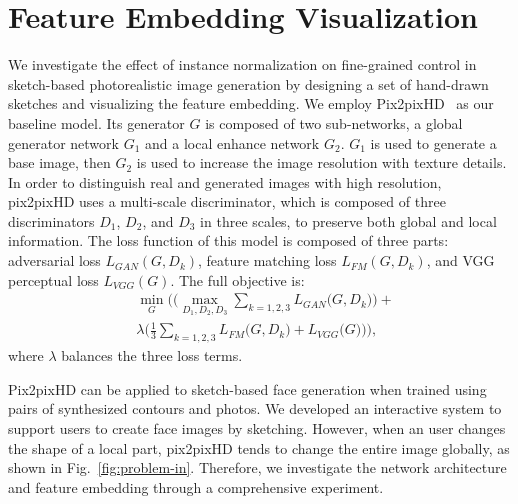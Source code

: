 \section{Feature Embedding Visualization}
\label{sec:visualize}

We investigate the effect of instance normalization on fine-grained control in sketch-based photorealistic image generation by designing a set of hand-drawn sketches and visualizing the feature embedding.
We employ Pix2pixHD~\cite{pix2pixhd} as our baseline model.
Its generator $G$ is composed of two sub-networks, a global generator network $G_1$ and a local enhance network $G_2$. 
$G_1$ is used to generate a base image, then $G_2$ is used to increase the image resolution with texture details. 
In order to distinguish real and generated images with high resolution, pix2pixHD uses a multi-scale discriminator, which is composed of three discriminators $D_1$, $D_2$, and $D_3$ in three scales, to preserve both global and local information. 
The loss function of this model is composed of three parts: adversarial loss $L_{GAN}(G,D_k)$, feature matching loss $L_{FM}(G,D_k)$, and VGG perceptual loss $L_{VGG}(G)$. The full objective is:
\begin{equation}
\begin{split}
&\underset{G}{\min}\Bigg(\bigg(\underset{D_1,D_2,D_3}{\max} \sum_{k=1,2,3}{L_{GAN}\big(G,D_k\big)}\bigg)+  \\
&\lambda \bigg(\frac{1}{3}\sum_{k=1,2,3}{L_{FM}\big(G,D_k\big)}+L_{VGG}{\big(G\big)}\bigg)\Bigg),
\end{split}
\end{equation}
\noindent
where $\lambda$ balances the three loss terms.


Pix2pixHD can be applied to sketch-based face generation when trained using pairs of synthesized contours and photos. 
We developed an interactive system to support users to create face images by sketching. 
However, when an user changes the shape of a local part, pix2pixHD tends to change the entire image globally, as shown in Fig.~\ref{fig:problem-in}.
Therefore, we investigate the network architecture and feature embedding through a comprehensive experiment.


